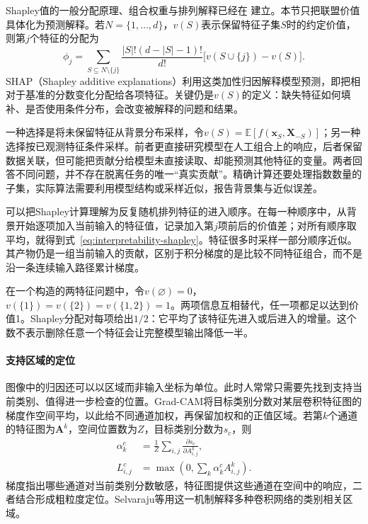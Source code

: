 Shapley值的一般分配原理、组合权重与排列解释已经在
建立。本节只把联盟价值具体化为预测解释。若$N=\{1,\ldots,d\}$，$v(S)$表示保留特征子集$S$时的约定价值，则第$j$个特征的分配为
\begin{equation}
 \phi_j=\sum_{S\subseteq N\setminus\{j\}}
 \frac{|S|!(d-|S|-1)!}{d!}
 \bigl[v(S\cup\{j\})-v(S)\bigr].
 \label{eq:interpretability-shapley}
\end{equation}
SHAP（Shapley additive explanations）利用这类加性归因解释模型预测，即把相对于基准的分数变化分配给各项特征。关键仍是$v(S)$的定义：缺失特征如何填补、是否使用条件分布，会改变被解释的问题和结果。

一种选择是将未保留特征从背景分布采样，令$v(S)=\mathbb E[f(\bm{x}_S,\bm{X}_{-S})]$；另一种选择按已观测特征条件采样。前者更直接研究模型在人工组合上的响应，后者保留数据关联，但可能把贡献分给模型未直接读取、却能预测其他特征的变量。两者回答不同问题，并不存在脱离任务的唯一“真实贡献”。精确计算还要处理指数数量的子集，实际算法需要利用模型结构或采样近似，报告背景集与近似误差。

可以把Shapley计算理解为反复随机排列特征的进入顺序。在每一种顺序中，从背景开始逐项加入当前输入的特征值，记录加入第$j$项前后的价值差；对所有顺序取平均，就得到式~\eqref{eq:interpretability-shapley}。特征很多时采样一部分顺序近似。其产物仍是一组当前输入的贡献，区别于积分梯度的是比较不同特征组合，而不是沿一条连续输入路径累计梯度。

\begin{example}[共同信息的贡献分配]
\label{ex:interpretability-redundancy}
在一个构造的两特征问题中，令$v(\varnothing)=0$，$v(\{1\})=v(\{2\})=v(\{1,2\})=1$。两项信息互相替代，任一项都足以达到价值1。Shapley分配对每项给出$1/2$：它平均了该特征先进入或后进入的增量。这个数不表示删除任意一个特征会让完整模型输出降低一半。
\end{example}

\paragraph{支持区域的定位}

图像中的归因还可以以区域而非输入坐标为单位。此时人常常只需要先找到支持当前类别、值得进一步检查的位置。Grad-CAM将目标类别分数对某层卷积特征图的梯度作空间平均，以此给不同通道加权，再保留加权和的正值区域。若第$k$个通道的特征图为$\bm A^k$，空间位置数为$Z$，目标类别分数为$s_c$，则
\begin{equation}
 \begin{aligned}
 \alpha_k^c&=\frac{1}{Z}\sum_{i,j}
 \frac{\partial s_c}{\partial A^k_{i,j}},\\
 L^c_{i,j}&=\max\!\left(0,\sum_k\alpha_k^c A^k_{i,j}\right).
 \end{aligned}
 \label{eq:interpretability-gradcam}
\end{equation}
梯度指出哪些通道对当前类别分数敏感，特征图提供这些通道在空间中的响应，二者结合形成粗粒度定位。Selvaraju等用这一机制解释多种卷积网络的类别相关区域。

